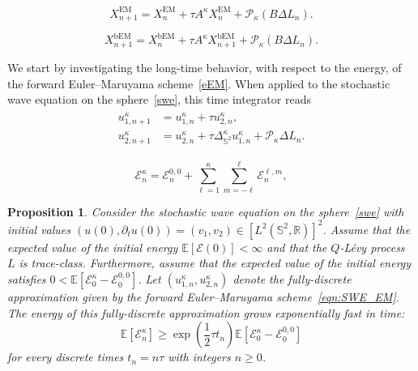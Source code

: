 \documentclass[10pt,a4paper]{amsart}
\newtheorem{proposition}{Proposition}
\newcommand{\Deltalb}{\Delta_{\IS^2}}
\newcommand{\E}{{\mathbb E}}
\newcommand{\IS}{\mathbb{S}}
\newcommand{\R}{{\mathbb R}}
\newcommand{\cE}{\mathcal E}
\newcommand{\cP}{\mathcal{P}}
\begin{document}
\begin{equation}\label{eEM}
X^{\text{EM}}_{n+1}=X^{\text{EM}}_{n}+\tau A^\kappa X^{\text{EM}}_{n}+\cP_\kappa\left(B\Delta L_n\right).
\end{equation}

\begin{equation}\label{bEM}
X^{\text{bEM}}_{n+1}=X^{\text{bEM}}_{n}+\tau A^\kappa X^{\text{bEM}}_{n+1}+\cP_\kappa\left(B\Delta L_n\right).
\end{equation}

We start by investigating the long-time behavior, with respect to the energy, of the forward Euler--Maruyama scheme~\eqref{eEM}. When applied to the stochastic wave equation on the sphere~\eqref{swe}, this time integrator reads 
\begin{align}
    \begin{split}
\label{eqn:SWE_EM}
u_{1,n+1}^\kappa&=u_{1,n}^\kappa+\tau u_{2,n}^\kappa,\\
u_{2,n+1}^\kappa&=u_{2,n}^\kappa+\tau \Deltalb^\kappa u_{1,n}^\kappa+\cP_\kappa\Delta L_n.
    \end{split}
\end{align}

\begin{equation}\label{energEM}
\mathcal{E}^\kappa_n=\mathcal{E}^{0,0}_n+\sum_{\ell=1}^{\kappa}\sum_{m=-\ell}^{\ell} \mathcal{E}^{\ell,m}_n,
\end{equation}

\begin{proposition}\label{prop:energy-em}
Consider the stochastic wave equation on the sphere~\eqref{swe} with initial values $(u(0),\partial_tu(0))=(v_1,v_2)\in [L^2(\IS^2,\R)]^2$.
Assume that the expected value of the initial energy $\E\left[\mathcal{E}(0)\right]<\infty$ and that the $Q$-L\'evy process $L$ is trace-class.
Furthermore, assume that the expected value of the initial energy satisfies $0<\E\left[\mathcal{E}^\kappa_0-\cE_0^{0,0}\right]$.
Let $(u_{1,n}^\kappa, u_{2,n}^\kappa)$ denote the fully-discrete approximation given by the forward Euler--Maruyama scheme~\eqref{eqn:SWE_EM}.
The energy of this fully-discrete approximation grows exponentially fast in time:
\begin{equation*}
\E\left[\mathcal{E}^\kappa_n\right] \geq \exp\left(\frac12\tau t_n\right)\E\left[\mathcal{E}^\kappa_0 - \mathcal{E}_0^{0,0}\right]
\end{equation*}
for every discrete times $t_n=n\tau$ with integers $n\geq0$.
\end{proposition}
\end{document}
